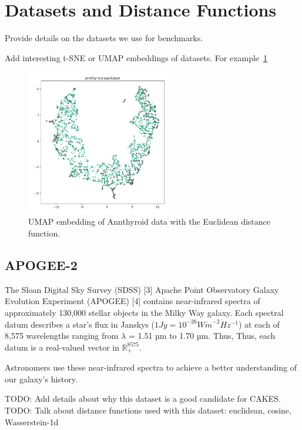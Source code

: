 \section{Datasets and Distance Functions}
\label{sec:datasets-and-distance-functions}

Provide details on the datasets we use for benchmarks.

Add interesting t-SNE or UMAP embeddings of datasets.
For example~\ref{fig:discussion:umap-annthyroid-euclidean}

\begin{figure}[ht!]
    \centering
    \includegraphics[width=2.5in]{images/umaps/annthyroid-euclidean-umap2d.png}
    \caption{UMAP embedding of Annthyroid data with the Euclidean distance function.}
    \label{fig:discussion:umap-annthyroid-euclidean}
\end{figure}

\subsection{APOGEE-2}
\label{subsec:datasets:apogee-2}
The Sloan Digital Sky Survey (SDSS) [3] Apache Point Observatory Galaxy Evolution
Experiment (APOGEE) [4] contains near-infrared
spectra of approximately 130,000 stellar objects in the Milky
Way galaxy. Each spectral datum describes a star's flux in
Janskys ($1 Jy = 10^{-26} W \dot m^{-2} \dot Hz^{-1}$) at each of 8,575 wavelengths ranging from $\lambda$ = 1.51 µm to 1.70 µm. Thus,
Thus, each datum is a real-valued vector in $\mathbb{R}_{+}^{8575}$. 

Astronomers use these near-infrared spectra to achieve a better understanding of our galaxy's history. 

TODO: Add details about why this dataset is a good candidate for CAKES.
TODO: Talk about distance functions used with this dataset: euclidean, cosine, Wasserstein-1d

